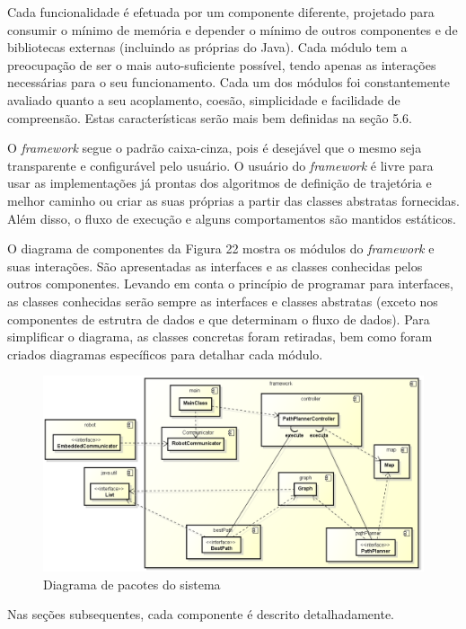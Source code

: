 Cada funcionalidade é efetuada por um componente diferente, projetado para consumir o mínimo de memória e depender o mínimo de outros componentes e de bibliotecas externas (incluindo as próprias do Java). Cada módulo tem a preocupação de ser o mais auto-suficiente possível, tendo apenas as interações necessárias para o seu funcionamento. Cada um dos módulos foi constantemente avaliado quanto a seu acoplamento, coesão,  simplicidade e facilidade de compreensão. Estas características serão mais bem definidas na seção 5.6.

O \textit{framework} segue o padrão caixa-cinza, pois é desejável que o mesmo seja transparente e configurável pelo usuário. O usuário do \textit{framework} é livre para usar as implementações já prontas dos algoritmos de definição de trajetória e melhor caminho ou criar as suas próprias a partir das classes abstratas fornecidas. Além disso, o fluxo de execução e alguns comportamentos são mantidos estáticos.

O diagrama de componentes da Figura 22 mostra os módulos do \textit{framework} e suas interações. São apresentadas as interfaces e as classes conhecidas pelos outros componentes. Levando em conta o princípio de programar para interfaces, as classes conhecidas serão sempre as interfaces e classes abstratas (exceto nos componentes de estrutra de dados e que determinam o fluxo de dados). Para simplificar o diagrama, as classes concretas foram retiradas, bem como foram criados diagramas específicos para detalhar cada módulo.

\begin{figure}[h]
	\centering
	\label{fig22}
		\includegraphics[keepaspectratio=true,scale=0.5]{figuras/componentes.png}
	\caption{Diagrama de pacotes do sistema}
\end{figure}

Nas seções subsequentes, cada componente é descrito detalhadamente.

